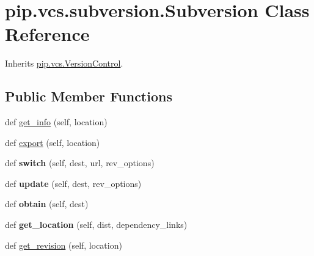 \hypertarget{classpip_1_1vcs_1_1subversion_1_1_subversion}{}\section{pip.\+vcs.\+subversion.\+Subversion Class Reference}
\label{classpip_1_1vcs_1_1subversion_1_1_subversion}


Inherits \hyperlink{classpip_1_1vcs_1_1_version_control}{pip.\+vcs.\+Version\+Control}.

\subsection*{Public Member Functions}
\begin{DoxyCompactItemize}
\item 
def \hyperlink{classpip_1_1vcs_1_1subversion_1_1_subversion_aa2b3eebacf643076bda129359e6ea31b}{get\+\_\+info} (self, location)
\item 
def \hyperlink{classpip_1_1vcs_1_1subversion_1_1_subversion_ab0ab9794491ff5449f31f4c1dda6941e}{export} (self, location)
\item 
\mbox{\label{classpip_1_1vcs_1_1subversion_1_1_subversion_a4b8d4851a4e27c386931e701902332f8}} 
def {\bfseries switch} (self, dest, url, rev\+\_\+options)
\item 
\mbox{\label{classpip_1_1vcs_1_1subversion_1_1_subversion_a72fae08773a22f093fbfa292c41cf92f}} 
def {\bfseries update} (self, dest, rev\+\_\+options)
\item 
\mbox{\label{classpip_1_1vcs_1_1subversion_1_1_subversion_a32fbad0d733460eb28bd5ec3189acf01}} 
def {\bfseries obtain} (self, dest)
\item 
\mbox{\label{classpip_1_1vcs_1_1subversion_1_1_subversion_aec889431d3730dcf39442bf5a6103523}} 
def {\bfseries get\+\_\+location} (self, dist, dependency\+\_\+links)
\item 
def \hyperlink{classpip_1_1vcs_1_1subversion_1_1_subversion_ab231b21b74c518d4f97069c6f49e8be5}{get\+\_\+revision} (self, location)
\item 
\mbox{\label{classpip_1_1vcs_1_1subversion_1_1_subversion_a09bb95389bd1cf168e2b25583e3fe9d0}} 

\end{DoxyCompactItemize}
